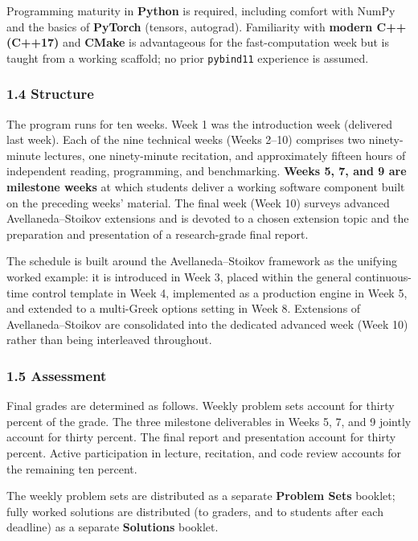 \documentclass[
]{article}
\begin{document}
Programming maturity in \textbf{Python} is required, including comfort
with NumPy and the basics of \textbf{PyTorch} (tensors, autograd).
Familiarity with \textbf{modern C++ (C++17)} and \textbf{CMake} is
advantageous for the fast-computation week but is taught from a working
scaffold; no prior \texttt{pybind11} experience is assumed.

\subsubsection{1.4 Structure}\label{structure}

The program runs for ten weeks. Week 1 was the introduction week
(delivered last week). Each of the nine technical weeks (Weeks 2--10)
comprises two ninety-minute lectures, one ninety-minute recitation, and
approximately fifteen hours of independent reading, programming, and
benchmarking. \textbf{Weeks 5, 7, and 9 are milestone weeks} at which
students deliver a working software component built on the preceding
weeks' material. The final week (Week 10) surveys advanced
Avellaneda--Stoikov extensions and is devoted to a chosen extension
topic and the preparation and presentation of a research-grade final
report.

The schedule is built around the Avellaneda--Stoikov framework as the
unifying worked example: it is introduced in Week 3, placed within the
general continuous-time control template in Week 4, implemented as a
production engine in Week 5, and extended to a multi-Greek options
setting in Week 8. Extensions of Avellaneda--Stoikov are consolidated
into the dedicated advanced week (Week 10) rather than being interleaved
throughout.

\subsubsection{1.5 Assessment}\label{assessment}

Final grades are determined as follows. Weekly problem sets account for
thirty percent of the grade. The three milestone deliverables in Weeks
5, 7, and 9 jointly account for thirty percent. The final report and
presentation account for thirty percent. Active participation in
lecture, recitation, and code review accounts for the remaining ten
percent.

The weekly problem sets are distributed as a separate \textbf{Problem
Sets} booklet; fully worked solutions are distributed (to graders, and
to students after each deadline) as a separate \textbf{Solutions}
booklet.
\end{document}

